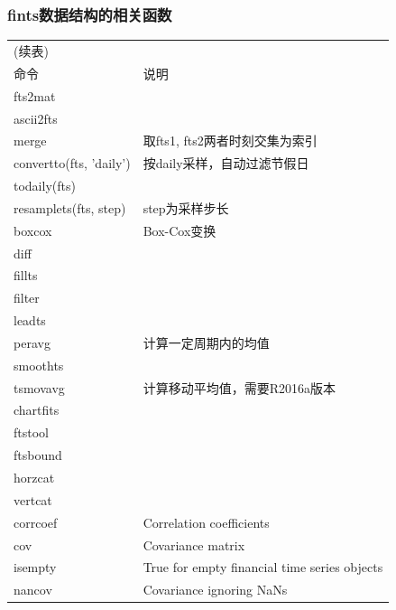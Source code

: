         \subsubsection{fints数据结构的相关函数}
            \begin{longtable}{|l|l|}
            \hline
            \endfirsthead
            \multicolumn{2}{l}{(续表)}
            \endhead
            \hline
            \multicolumn{2}{c}{\itshape 接下页表格……}\\
            \endfoot
            \hline
            \endlastfoot
            \hline
            命令 & 说明 \\
            \hline
            fts2mat & {}\\\hline
            ascii2fts & {}\\\hline
            merge &取fts1, fts2两者时刻交集为索引\\\hline
            convertto(fts, ’daily’) &按daily采样，自动过滤节假日\\\hline
            todaily(fts)  & {}\\\hline
            resamplets(fts, step) &step为采样步长\\\hline
            boxcox  &Box-Cox变换\\\hline
            diff  & {}\\\hline
            fillts  & {}\\\hline
            filter & {} \\\hline
            leadts & {}\\\hline
            peravg  &计算一定周期内的均值\\\hline
            smoothts & {}\\\hline
            tsmovavg  &计算移动平均值，需要R2016a版本\\\hline
            chartfits & {}\\\hline
            ftstool & {}\\\hline
            ftsbound & {}\\\hline
            horzcat & {}\\\hline
            vertcat & {}\\\hline
            corrcoef & Correlation coefficients\\\hline
            cov & Covariance matrix\\\hline
            isempty & True for empty financial time series objects\\\hline
            nancov & Covariance ignoring NaNs\\\hline

\end{longtable}
